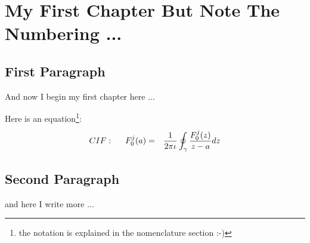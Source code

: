 
\chapter{My First Chapter But Note The Numbering ...}
\ifpdf
    \graphicspath{{Chapter1/Chapter1Figs/PNG/}{Chapter1/Chapter1Figs/PDF/}{Chapter1/Chapter1Figs/}}
\else
    \graphicspath{{Chapter1/Chapter1Figs/EPS/}{Chapter1/Chapter1Figs/}}
\fi
{}

\section{First Paragraph}

And now I begin my first chapter here ...

Here is an equation\footnote{the notation is explained in the nomenclature section :-)}:
\begin{eqnarray}
CIF: \hspace*{5mm}F_0^j(a) &=& \frac{1}{2\pi \iota} \oint_{\gamma} \frac{F_0^j(z)}{z - a} dz
\end{eqnarray}
\nomenclature[gp]{$\pi$}{ $\simeq 3.14\ldots$}                                             %

\section{Second Paragraph}
and here I write more ...\cite{texbook}

